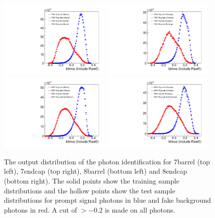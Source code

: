 \begin{figure}
  \includegraphics[width=0.48\textwidth]{ch4_selec_and_cats/plots/photonID_7TeV_barrel.pdf}
  \includegraphics[width=0.48\textwidth]{ch4_selec_and_cats/plots/photonID_7TeV_endcap.pdf} \\
  \includegraphics[width=0.48\textwidth]{ch4_selec_and_cats/plots/photonID_8TeV_barrel.pdf}
  \includegraphics[width=0.48\textwidth]{ch4_selec_and_cats/plots/photonID_8TeV_endcap.pdf}
  \caption{The output distribution of the photon identification \BDT for 7\TeV barrel (top left), 7\TeV endcap (top right), 8\TeV barrel (bottom left) and 8\TeV endcap (bottom right). The solid points show the \gjet training sample distributions and the hollow points show the \Hgg test sample distributions for prompt signal photons in blue and fake background photons in red. A cut of $>-0.2$ is made on all photons.}
  \label{fig:photon_id_bdt}
\end{figure}

